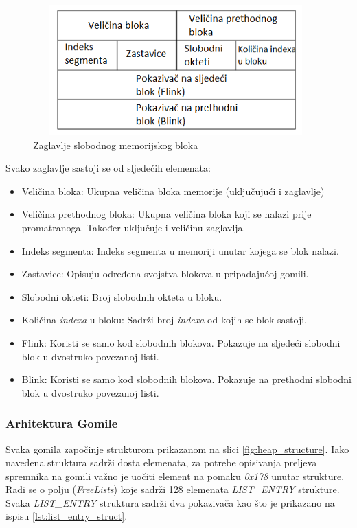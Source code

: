 \documentclass[times, utf8, diplomski, numeric]{fer}
\begin{document}
\begin{figure}[!ht]
\centering
\setlength\fboxsep{0pt}
\setlength\fboxrule{0.5pt}
\includegraphics[width=11cm, height=5cm]{slike/free_heap_block}
\caption{Zaglavlje slobodnog memorijskog bloka}
\label{fig:free_heap_block} 
\end{figure}

Svako zaglavlje sastoji se od sljedećih elemenata:

\begin{itemize}
\item Veličina bloka: Ukupna veličina bloka memorije (uključujući i zaglavlje)
\item Veličina prethodnog bloka: Ukupna veličina bloka koji se nalazi prije promatranoga. Također uključuje i veličinu zaglavlja.
\item Indeks segmenta: Indeks segmenta u memoriji unutar kojega se blok nalazi.
\item Zastavice: Opisuju određena svojstva blokova u pripadajućoj gomili.
\item Slobodni okteti: Broj slobodnih okteta u bloku.
\item Količina \emph{indexa} u bloku: Sadrži broj \emph{indexa} od kojih se blok sastoji. 
\item Flink: Koristi se samo kod slobodnih blokova. Pokazuje na sljedeći slobodni blok u dvostruko povezanoj listi.
\item Blink: Koristi se samo kod slobodnih blokova. Pokazuje na prethodni slobodni blok u dvostruko povezanoj listi.
\end{itemize}

\subsubsection{Arhitektura Gomile}

Svaka gomila započinje strukturom prikazanom na slici 
\ref{fig:heap_structure}. Iako navedena struktura sadrži dosta
elemenata, za potrebe opisivanja preljeva spremnika na gomili
važno je uočiti element na pomaku \emph{0x178} unutar strukture.
Radi se o polju (\emph{FreeLists}) koje sadrži 128 elemenata
\emph{LIST\_ENTRY} strukture. Svaka \emph{LIST\_ENTRY} struktura
sadrži dva pokazivača kao što je prikazano na ispisu 
\ref{lst:list_entry_struct}.
\end{document}

